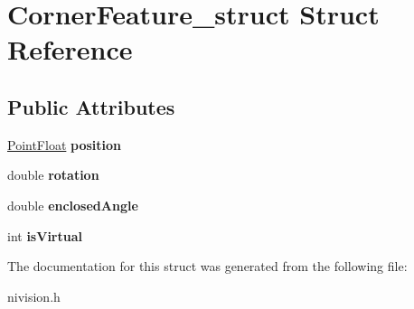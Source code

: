 \hypertarget{structCornerFeature__struct}{
\section{CornerFeature\_\-struct Struct Reference}
\label{structCornerFeature__struct}
}
\subsection*{Public Attributes}
\begin{DoxyCompactItemize}
\item 
\hypertarget{structCornerFeature__struct_a9cae905c455ca29597ee2fd7d2e0e6f3}{
\hyperlink{structPointFloat__struct}{PointFloat} {\bfseries position}}
\label{structCornerFeature__struct_a9cae905c455ca29597ee2fd7d2e0e6f3}

\item 
\hypertarget{structCornerFeature__struct_a7f9e5c0dd4e33925834f4cbd5c366bd4}{
double {\bfseries rotation}}
\label{structCornerFeature__struct_a7f9e5c0dd4e33925834f4cbd5c366bd4}

\item 
\hypertarget{structCornerFeature__struct_a175f1661c23ee1a019d8077a82a39012}{
double {\bfseries enclosedAngle}}
\label{structCornerFeature__struct_a175f1661c23ee1a019d8077a82a39012}

\item 
\hypertarget{structCornerFeature__struct_ae9cfdde960b71697e4710e8b451b78e9}{
int {\bfseries isVirtual}}
\label{structCornerFeature__struct_ae9cfdde960b71697e4710e8b451b78e9}

\end{DoxyCompactItemize}


The documentation for this struct was generated from the following file:\begin{DoxyCompactItemize}
\item 
nivision.h\end{DoxyCompactItemize}
